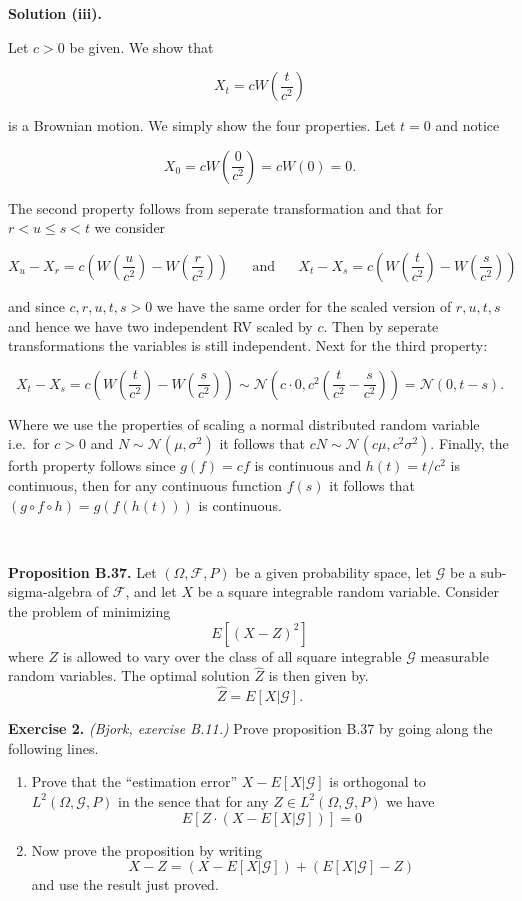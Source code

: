 \documentclass[
]{article}
\providecommand{\tightlist}{%
  \setlength{\itemsep}{0pt}\setlength{\parskip}{0pt}}
\begin{document}
\textbf{Solution (iii).}

Let \(c>0\) be given. We show that

\[X_t=cW\left(\frac{t}{c^2}\right)\]

is a Brownian motion. We simply show the four properties. Let \(t=0\)
and notice

\[X_0=cW\left(\frac{0}{c^2}\right)=cW(0)=0.\]

The second property follows from seperate transformation and that for
\(r<u\le s<t\) we consider

\[X_u-X_r=c\left(W\left(\frac{u}{c^2}\right)-W\left(\frac{r}{c^2}\right)\right)\hspace{20pt}\text{and}\hspace{20pt}X_t-X_s=c\left(W\left(\frac{t}{c^2}\right)-W\left(\frac{s}{c^2}\right)\right)\]

and since \(c,r,u,t,s>0\) we have the same order for the scaled version
of \(r,u,t,s\) and hence we have two independent RV scaled by \(c\).
Then by seperate transformations the variables is still independent.
Next for the third property:

\[X_t-X_s=c\left(W\left(\frac{t}{c^2}\right)-W\left(\frac{s}{c^2}\right)\right)\sim\mathcal{N}\left(c\cdot 0,c^2\left(\frac{t}{c^2}-\frac{s}{c^2}\right)\right)=\mathcal{N}(0,t-s).\]

Where we use the properties of scaling a normal distributed random
variable i.e.~for \(c>0\) and \(N\sim\mathcal{N}(\mu,\sigma ^2)\) it
follows that \(c N\sim\mathcal{N}(c\mu,c^2\sigma ^2)\). Finally, the
forth property follows since \(g(f)=cf\) is continuous and
\(h(t)=t/c^2\) is continuous, then for any continuous function \(f(s)\)
it follows that \((g \circ f\circ h)=g(f(h(t)))\) is continuous.

~

\textbf{Proposition B.37.} Let \((\Omega,\mathcal{F},P)\) be a given
probability space, let \(\mathcal{G}\) be a sub-sigma-algebra of
\(\mathcal{F}\), and let \(X\) be a square integrable random variable.
Consider the problem of minimizing \[E\left[(X-Z)^2\right]\] where \(Z\)
is allowed to vary over the class of all square integrable
\(\mathcal{G}\) measurable random variables. The optimal solution
\(\hat{Z}\) is then given by. \[\hat{Z}=E[X\vert\mathcal{G}].\]

\textbf{Exercise 2.} \emph{(Bjork, exercise B.11.)} Prove proposition
B.37 by going along the following lines.

\begin{enumerate}
\def\labelenumi{\alph{enumi}.}
\tightlist
\item
  Prove that the ``estimation error'' \(X-E[X\vert\mathcal{G}]\) is
  orthogonal to \(L^2(\Omega,\mathcal{G},P)\) in the sence that for any
  \(Z\in L^2(\Omega,\mathcal{G},P)\) we have
  \[E[Z\cdot(X-E[X\vert\mathcal{G}])]=0\]
\item
  Now prove the proposition by writing
  \[X-Z=(X-E[X\vert\mathcal{G}])+(E[X\vert\mathcal{G}]-Z)\] and use the
  result just proved.
\end{enumerate}
\end{document}

